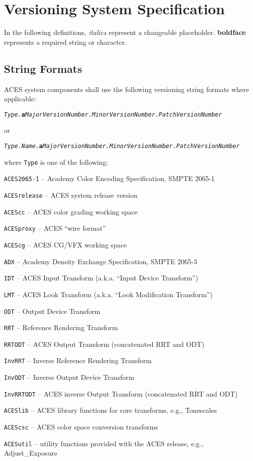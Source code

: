 \regularsectionformat
\chapter{Versioning System Specification}
In the following definitions, \textit{italics} represent a changeable placeholder. \textbf{boldface} represents a required string or character.

\section{String Formats}
ACES system components shall use the following versioning string formats where applicable:

\texttt{\textit{Type.}\textbf{a}\textit{MajorVersionNumber.MinorVersionNumber.PatchVersionNumber}}

or

\texttt{\textit{Type.Name.}\textbf{a}\textit{MajorVersionNumber.MinorVersionNumber.PatchVersionNumber}}

where \texttt{Type} is one of the following:

\begin{listize}
    \item \texttt{ACES2065-1} -- Academy Color Encoding Specification, SMPTE 2065-1
    \item \texttt{ACESrelease} -- ACES system release version
    \item \texttt{ACEScc} -- ACES color grading working space
    \item \texttt{ACESproxy} -- ACES ``wire format''
    \item \texttt{ACEScg} -- ACES CG/VFX working space
    \item \texttt{ADX} -- Academy Density Exchange Specification, SMPTE 2065-3
    \item \texttt{IDT} -- ACES Input Transform (a.k.a. ``Input Device Transform'')
    \item \texttt{LMT} -- ACES Look Transform (a.k.a. ``Look Modification Transform'')
    \item \texttt{ODT} -- Output Device Transform
    \item \texttt{RRT} -- Reference Rendering Transform
    \item \texttt{RRTODT} -- ACES Output Transform (concatenated RRT and ODT)
    \item \texttt{InvRRT} -- Inverse Reference Rendering Transform
    \item \texttt{InvODT} -- Inverse Output Device Transform
    \item \texttt{InvRRTODT} -- ACES inverse Output Transform (concatenated RRT and ODT)
    \item \texttt{ACESlib} -- ACES library functions for core transforms, e.g., Tonescales
    \item \texttt{ACEScsc} -- ACES color space conversion transforms
    \item \texttt{ACESutil} -- utility functions provided with the ACES release, e.g., Adjust\_Exposure
\end{listize}

